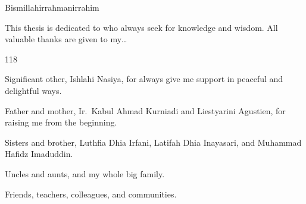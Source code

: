 
\begingroup
\let\clearpage\relax
\let\cleardoublepage\relax


Bismillahirrahmanirrahim

\noindent This thesis is dedicated to who always seek for knowledge and wisdom.
\noindent All valuable thanks are given to my\ldots

\hfill

\begin{dinglist}{118}
\item Significant other, Ishlahi Nasiya, for always give me support in peaceful and delightful ways.
\item Father and mother, Ir.\ Kabul Ahmad Kurniadi and Liestyarini Agustien, for raising me from the beginning.
\item Sisters and brother, Luthfia Dhia Irfani, Latifah Dhia Inayasari, and Muhammad Hafidz Imaduddin.
\item Uncles and aunts, and my whole big family.
\item Friends, teachers, colleagues, and communities.
\end{dinglist}

\endgroup
